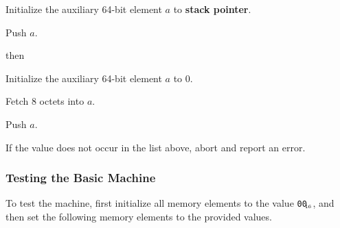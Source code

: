 \documentclass[a4paper,12pt]{article}
\newcommand{\num}[1]{\texttt{#1}\xspace}
\newcommand{\hex}[1]{\num{#1}$_{\textup{\tiny\hskip-1ex 16}}$\xspace}
\newcommand{\SP}{\textbf{stack pointer}\xspace}
\newcommand{\op}[1]{#1}
\newcommand{\PUSHL}     [1]{\op{\hex{0B}}}
\begin{document}
\begin{stepnumbers}
\begin{description}
\begin{stepnumbers}
    \item Initialize the auxiliary 64-bit element $a$ to \SP.
    \item Push $a$.
    \end{stepnumbers}
  \item[\PUSHL{}] then
    \begin{stepnumbers}
    \item Initialize the auxiliary 64-bit element $a$ to 0.
    \item Fetch 8 octets into $a$.
    \item Push $a$.
    \end{stepnumbers}
  \end{description}
\item If the value does not occur in the list above, abort and report an error.
\end{stepnumbers}

\subsubsection{Testing the Basic Machine}

To test the machine, first initialize all memory elements to the value \hex{00}, and then set the following memory elements to the provided values.
\end{document}
